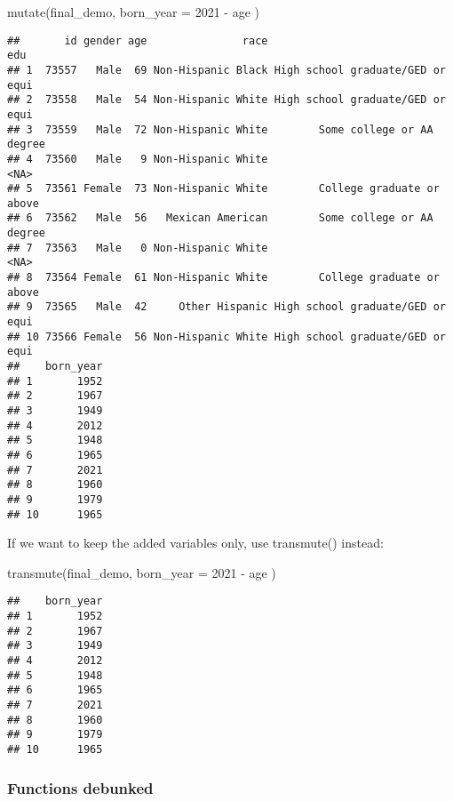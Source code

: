 \documentclass[
]{book}
\newenvironment{Shaded}{\begin{snugshade}}{\end{snugshade}}
\newcommand{\AttributeTok}[1]{\textcolor[rgb]{0.77,0.63,0.00}{#1}}
\newcommand{\DecValTok}[1]{\textcolor[rgb]{0.00,0.00,0.81}{#1}}
\newcommand{\FunctionTok}[1]{\textcolor[rgb]{0.00,0.00,0.00}{#1}}
\newcommand{\NormalTok}[1]{#1}
\newcommand{\SpecialCharTok}[1]{\textcolor[rgb]{0.00,0.00,0.00}{#1}}
\begin{document}
\begin{Shaded}
\begin{Highlighting}[]
\FunctionTok{mutate}\NormalTok{(final\_demo,}
       \AttributeTok{born\_year =} \DecValTok{2021} \SpecialCharTok{{-}}\NormalTok{ age }
\NormalTok{      )}
\end{Highlighting}
\end{Shaded}

\begin{verbatim}
##       id gender age               race                              edu
## 1  73557   Male  69 Non-Hispanic Black High school graduate/GED or equi
## 2  73558   Male  54 Non-Hispanic White High school graduate/GED or equi
## 3  73559   Male  72 Non-Hispanic White        Some college or AA degree
## 4  73560   Male   9 Non-Hispanic White                             <NA>
## 5  73561 Female  73 Non-Hispanic White        College graduate or above
## 6  73562   Male  56   Mexican American        Some college or AA degree
## 7  73563   Male   0 Non-Hispanic White                             <NA>
## 8  73564 Female  61 Non-Hispanic White        College graduate or above
## 9  73565   Male  42     Other Hispanic High school graduate/GED or equi
## 10 73566 Female  56 Non-Hispanic White High school graduate/GED or equi
##    born_year
## 1       1952
## 2       1967
## 3       1949
## 4       2012
## 5       1948
## 6       1965
## 7       2021
## 8       1960
## 9       1979
## 10      1965
\end{verbatim}

If we want to keep the added variables only, use transmute() instead:

\begin{Shaded}
\begin{Highlighting}[]
\FunctionTok{transmute}\NormalTok{(final\_demo,}
    \AttributeTok{born\_year =} \DecValTok{2021} \SpecialCharTok{{-}}\NormalTok{ age}
\NormalTok{     )}
\end{Highlighting}
\end{Shaded}

\begin{verbatim}
##    born_year
## 1       1952
## 2       1967
## 3       1949
## 4       2012
## 5       1948
## 6       1965
## 7       2021
## 8       1960
## 9       1979
## 10      1965
\end{verbatim}

\hypertarget{functions-debunked-14}{%
\subsubsection{Functions debunked}\label{functions-debunked-14}}
\end{document}
